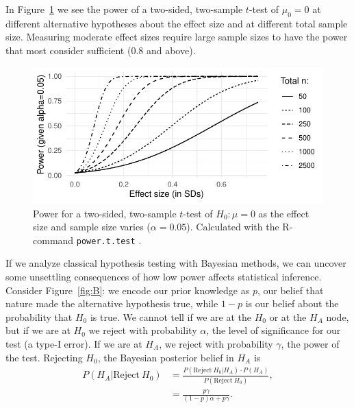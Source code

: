 \documentclass[10pt]{article}
\begin{document}
In Figure~\ref{fig:power} we see the power of a two-sided, two-sample $t$-test
of $\mu_0=0$ at different alternative hypotheses about the effect size and at
different total sample size. Measuring moderate effect sizes require large sample
sizes to have the power that most consider sufficient (0.8 and above). 

\begin{figure}[tb]
\includegraphics[width=\textwidth]{../graphs/powergraph}

\caption{Power for a two-sided, two-sample $t$-test of $H_0: \mu=0$ as the effect 
size and sample size varies ($\alpha=0.05$). Calculated with the R-command \texttt{power.t.test} \citep{R2023}.}\label{fig:power}
\end{figure}


If we analyze classical hypothesis testing with Bayesian methods, we can uncover
some unsettling consequences of how low power affects statistical inference.
Consider Figure~\ref{fig:B}: we encode our prior knowledge as $p$, our belief
that nature made the alternative hypothesis true, while $1-p$ is our belief
about the probability that $H_0$ is true. We cannot tell if we are at the
$H_0$ or at the $H_{\!A}$ node, but if we are at $H_0$ we reject with probability $\alpha$,
the level of significance for our test (a type-I error). If we are at $H_{\!A}$, we
reject with probability $\gamma$, the power of the test. Rejecting $H_0$, the
Bayesian posterior belief in $H_{\!A}$ is
\begin{align*}
   P(H_{\!A}|\mathrm{Reject}\ H_0) & = \frac{P(\mathrm{Reject}\ H_0|H_{\!A}) \cdot P(H_{\!A})}{P(\mathrm{Reject}\ H_0)}, \\
   &= \frac{p\gamma}{(1-p)\alpha + p\gamma}.  
\end{align*}
\end{document}
